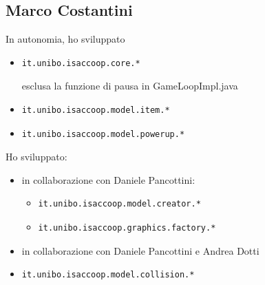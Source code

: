\documentclass[a4paper,12pt]{report}
\begin{document}
\subsection*{Marco Costantini}
In autonomia, ho sviluppato
\begin{itemize}
    \item \begin{verbatim}it.unibo.isaccoop.core.* \end{verbatim} esclusa la funzione di pausa in GameLoopImpl.java
    \item \begin{verbatim}it.unibo.isaccoop.model.item.* \end{verbatim}
    \item \begin{verbatim}it.unibo.isaccoop.model.powerup.* \end{verbatim}
\end{itemize}
Ho sviluppato: 
\begin{itemize}
\item in collaborazione con Daniele Pancottini: 
    \begin{itemize}
        \item \begin{verbatim}it.unibo.isaccoop.model.creator.* \end{verbatim} 
        \item \begin{verbatim}it.unibo.isaccoop.graphics.factory.* \end{verbatim}
    \end{itemize}
    \item in collaborazione con Daniele Pancottini e Andrea Dotti \item \begin{verbatim}it.unibo.isaccoop.model.collision.* \end{verbatim}
\end{itemize} 
\end{document}
